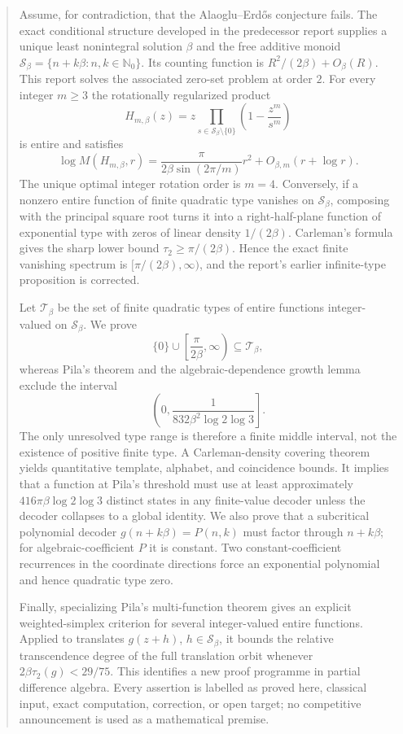 \documentclass[11pt,oneside]{article}
\theoremstyle{definition}
\theoremstyle{remark}
\newcommand{\Nzero}{\mathbb N_0}
\newcommand{\Sbeta}{\mathcal S_\beta}
\newcommand{\Tclass}{\mathcal T}
\begin{document}

\begin{abstract}
Assume, for contradiction, that the Alaoglu--Erd\H{o}s conjecture fails.  The exact
conditional structure developed in the predecessor report supplies a unique least
nonintegral solution $\beta$ and the free additive monoid
$\Sbeta=\{n+k\beta:n,k\in\Nzero\}$.  Its counting function is
$R^2/(2\beta)+O_\beta(R)$.  This report solves the associated zero-set problem at order
$2$.  For every integer $m\ge3$ the rotationally regularized product
\[
 H_{m,\beta}(z)=z\prod_{s\in\Sbeta\setminus\{0\}}
                    \left(1-\frac{z^m}{s^m}\right)
\]
is entire and satisfies
\[
 \log M(H_{m,\beta},r)
 =\frac{\pi}{2\beta\sin(2\pi/m)}r^2+O_{\beta,m}(r+\log r).
\]
The unique optimal integer rotation order is $m=4$.  Conversely, if a nonzero entire
function of finite quadratic type vanishes on $\Sbeta$, composing with the principal
square root turns it into a right-half-plane function of exponential type with zeros of
linear density $1/(2\beta)$.  Carleman's formula gives the sharp lower bound
$\tau_2\ge\pi/(2\beta)$.  Hence the exact finite vanishing spectrum is
$[\pi/(2\beta),\infty)$, and the report's earlier infinite-type proposition is corrected.

Let $\Tclass_\beta$ be the set of finite quadratic types of entire functions integer-valued
on $\Sbeta$.  We prove
\[
 \{0\}\cup\left[\frac{\pi}{2\beta},\infty\right)\subseteq\Tclass_\beta,
\]
whereas Pila's theorem and the algebraic-dependence growth lemma exclude the interval
\[
  \left(0,\frac{1}{832\beta^2\log2\log3}\right].
\]
The only unresolved type range is therefore a finite
middle interval, not the existence of positive finite type.  A Carleman-density covering
theorem yields quantitative template, alphabet, and coincidence bounds.  It implies that
a function at Pila's threshold must use at least approximately
$416\pi\beta\log2\log3$ distinct states in any finite-value decoder unless the decoder
collapses to a global identity.  We also prove that a subcritical polynomial decoder
$g(n+k\beta)=P(n,k)$ must factor through $n+k\beta$; for algebraic-coefficient $P$ it is
constant.  Two constant-coefficient recurrences in the coordinate directions force an
exponential polynomial and hence quadratic type zero.

Finally, specializing Pila's multi-function theorem gives an explicit weighted-simplex
criterion for several integer-valued entire functions.  Applied to translates
$g(z+h)$, $h\in\Sbeta$, it bounds the relative transcendence degree of the full translation
orbit whenever $2\beta\tau_2(g)<29/75$.  This identifies a new proof programme in partial
difference algebra.  Every assertion is labelled as proved here, classical input, exact
computation, correction, or open target; no competitive announcement is used as a
mathematical premise.
\end{abstract}
\end{document}

